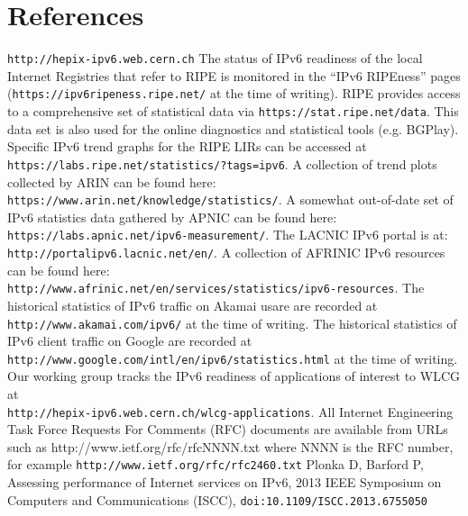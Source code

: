\section*{References}

\begin{thebibliography}{1}
 {\tt http://hepix-ipv6.web.cern.ch}
 The status of IPv6 readiness of the local Internet Registries
that refer to RIPE is monitored in the ``IPv6 RIPEness'' pages ({\tt https://ipv6ripeness.ripe.net/} at the time of writing). 
 RIPE provides access to a comprehensive set of statistical
data via {\tt https://stat.ripe.net/data}. This data set is also used for
the online diagnostics and statistical tools (e.g. BGPlay). 
 Specific
IPv6 trend graphs for the RIPE LIRs can be accessed at\\ {\tt https://labs.ripe.net/statistics/?tags=ipv6}.
 A collection of trend plots collected by ARIN
can be found here:\\ {\tt https://www.arin.net/knowledge/statistics/}.
 A somewhat out-of-date set of IPv6
statistics data gathered by APNIC can be found here:\\ {\tt https://labs.apnic.net/ipv6-measurement/}.
 The LACNIC IPv6 portal is at:\\ {\tt http://portalipv6.lacnic.net/en/}.
 A collection of AFRINIC IPv6 resources can be found here:\\  {\tt http://www.afrinic.net/en/services/statistics/ipv6-resources}.
 The historical statistics of IPv6 traffic on Akamai usare are recorded at {\tt http://www.akamai.com/ipv6/} at the time of writing.
 The historical statistics of IPv6 client traffic on Google are recorded at\\ {\tt http://www.google.com/intl/en/ipv6/statistics.html} at the time of writing.
 Our working group tracks the IPv6 readiness of applications
of interest to WLCG at\\ {\tt http://hepix-ipv6.web.cern.ch/wlcg-applications}.
 All Internet Engineering Task Force Requests For Comments (RFC) documents are available
from URLs such as http://www.ietf.org/rfc/rfcNNNN.txt where NNNN is the RFC number, for example {\tt http://www.ietf.org/rfc/rfc2460.txt}
 Plonka D, Barford P, Assessing performance of Internet services on IPv6, 2013 IEEE Symposium on Computers and Communications (ISCC), {\tt doi:10.1109/ISCC.2013.6755050}

\end{thebibliography}
